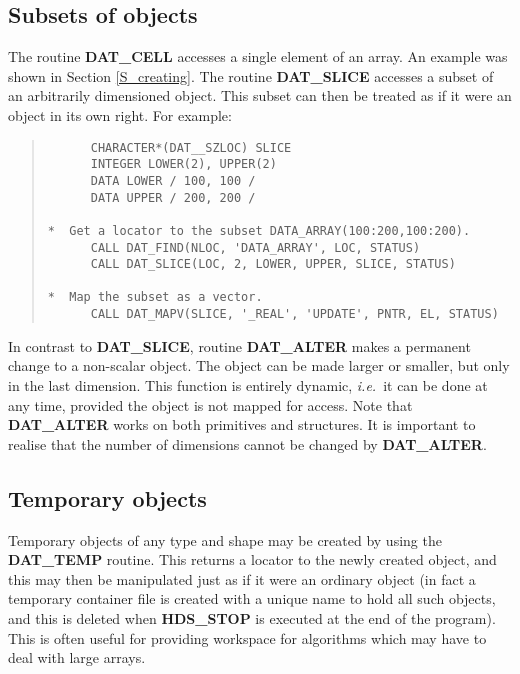 \subsection{Subsets of objects}

The routine {\bf DAT\_CELL} accesses a single element of an array.
An example was shown in Section \ref{S_creating}.
The routine {\bf DAT\_SLICE} accesses a subset of an arbitrarily dimensioned
object.
This subset can then be treated as if it were an object in its own right.
For example:

\begin{quote}

\begin{small}
\begin{verbatim}
      CHARACTER*(DAT__SZLOC) SLICE
      INTEGER LOWER(2), UPPER(2)
      DATA LOWER / 100, 100 /
      DATA UPPER / 200, 200 /

*  Get a locator to the subset DATA_ARRAY(100:200,100:200).
      CALL DAT_FIND(NLOC, 'DATA_ARRAY', LOC, STATUS)
      CALL DAT_SLICE(LOC, 2, LOWER, UPPER, SLICE, STATUS)

*  Map the subset as a vector.
      CALL DAT_MAPV(SLICE, '_REAL', 'UPDATE', PNTR, EL, STATUS)
\end{verbatim}
\end{small}

\end{quote}
In contrast to {\bf DAT\_SLICE}, routine {\bf DAT\_ALTER} makes a permanent
change to a non-scalar object.
The object can be made larger or smaller, but only in the last dimension.
This function is entirely dynamic, {\em i.e.}\, it can be done at any time,
provided the object is not mapped for access.
Note that {\bf DAT\_ALTER} works on both primitives and structures.
It is important to realise that the number of dimensions cannot be changed by
{\bf DAT\_ALTER}. 

\subsection{Temporary objects}

Temporary objects of any type and shape may be created by using the {\bf
DAT\_TEMP} routine.
This returns a locator to the newly created object, and this may then be
manipulated just as if it were an ordinary object (in fact a temporary
container file is created with a unique name to hold all such objects, and this
is deleted when {\bf HDS\_STOP} is executed at the end of the program).
This is often useful for providing workspace for algorithms which may have to
deal with large arrays. 

